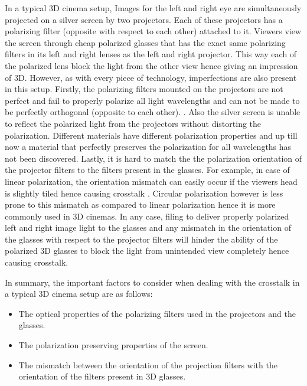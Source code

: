 In a typical 3D cinema setup, Images for the left and right eye are simultaneously projected on a silver screen by two projectors. Each of these projectors has a polarizing filter (opposite with respect to each other) attached to it. Viewers view the screen through cheap polarized glasses that has the exact same polarizing filters in its left and right lenses as the left and right projector. This way each of the polarized lens block the light from the other view hence giving an impression of 3D. However, as with every piece of technology, imperfections are also present in this setup. Firstly, the polarizing filters mounted on the projectors are not perfect and fail to properly polarize all light wavelengths and can not be made to be perfectly orthogonal (opposite to each other). \cite{woods2012crosstalk}. Also the silver screen is unable to reflect the polarized light from the projectors without distorting the polarization. Different materials have different polarization properties and up till now a material that perfectly preserves the polarization for all wavelengths has not been discovered. Lastly, it is hard to match the the polarization orientation of the projector filters to the filters present in the glasses. For example, in case of linear polarization, the orientation mismatch can easily occur if the viewers head is slightly tiled hence causing crosstalk \cite{hong2010analysis}. Circular polarization however is less prone to this mismatch as compared to linear polarization hence it is more commonly used in 3D cinemas. In any case, filing to deliver properly polarized left and right image light to the glasses and any mismatch in the orientation of the glasses with respect to the projector filters will hinder the ability of the polarized 3D glasses to block the light from unintended view completely hence causing crosstalk.

In summary, the important factors to consider when dealing with the crosstalk in a typical 3D cinema setup are as follows:
\begin{itemize}
\item{The optical properties of the polarizing filters used in the projectors and the glasses.}
\item{The polarization preserving properties of the screen. }
\item{The mismatch between the orientation of the projection filters with the orientation of the filters present in 3D glasses.}
\end{itemize}

